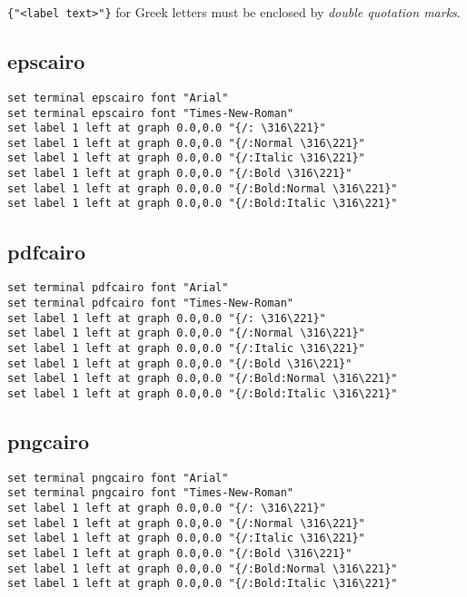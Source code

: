 \documentclass{ltjsarticle}
\begin{document}
			\noindent%
			\verb|{"<label text>"}| for Greek letters must be enclosed by \emph{double quotation marks}.

		\subsection{epscairo}

			\noindent%
			\verb|set terminal epscairo font "Arial"|\\%
			\verb|set terminal epscairo font "Times-New-Roman"|\\%
			\verb|set label 1 left at graph 0.0,0.0 "{/: \316\221}"|\\%
			\verb|set label 1 left at graph 0.0,0.0 "{/:Normal \316\221}"|\\%
			\verb|set label 1 left at graph 0.0,0.0 "{/:Italic \316\221}"|\\%
			\verb|set label 1 left at graph 0.0,0.0 "{/:Bold \316\221}"|\\%
			\verb|set label 1 left at graph 0.0,0.0 "{/:Bold:Normal \316\221}"|\\%
			\verb|set label 1 left at graph 0.0,0.0 "{/:Bold:Italic \316\221}"|%

		\subsection{pdfcairo}

			\noindent%
			\verb|set terminal pdfcairo font "Arial"|\\%
			\verb|set terminal pdfcairo font "Times-New-Roman"|\\%
			\verb|set label 1 left at graph 0.0,0.0 "{/: \316\221}"|\\%
			\verb|set label 1 left at graph 0.0,0.0 "{/:Normal \316\221}"|\\%
			\verb|set label 1 left at graph 0.0,0.0 "{/:Italic \316\221}"|\\%
			\verb|set label 1 left at graph 0.0,0.0 "{/:Bold \316\221}"|\\%
			\verb|set label 1 left at graph 0.0,0.0 "{/:Bold:Normal \316\221}"|\\%
			\verb|set label 1 left at graph 0.0,0.0 "{/:Bold:Italic \316\221}"|%

		\subsection{pngcairo}

			\noindent%
			\verb|set terminal pngcairo font "Arial"|\\%
			\verb|set terminal pngcairo font "Times-New-Roman"|\\%
			\verb|set label 1 left at graph 0.0,0.0 "{/: \316\221}"|\\%
			\verb|set label 1 left at graph 0.0,0.0 "{/:Normal \316\221}"|\\%
			\verb|set label 1 left at graph 0.0,0.0 "{/:Italic \316\221}"|\\%
			\verb|set label 1 left at graph 0.0,0.0 "{/:Bold \316\221}"|\\%
			\verb|set label 1 left at graph 0.0,0.0 "{/:Bold:Normal \316\221}"|\\%
			\verb|set label 1 left at graph 0.0,0.0 "{/:Bold:Italic \316\221}"|%
\end{document}

